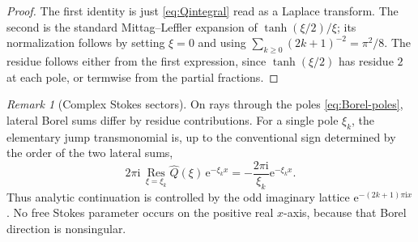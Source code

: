 \documentclass[11pt]{article}
\theoremstyle{definition}
\theoremstyle{remark}
\newtheorem{remark}[theorem]{Remark}
\newcommand{\e}{\mathrm e}
\newcommand{\ii}{\mathrm i}
\newcommand{\Res}{\operatorname*{Res}}
\begin{document}
\begin{proof}
The first identity is just \eqref{eq:Qintegral} read as a Laplace transform.  The second is the standard Mittag--Leffler expansion of $\tanh(\xi/2)/\xi$; its normalization follows by setting $\xi=0$ and using $\sum_{k\ge0}(2k+1)^{-2}=\pi^2/8$.  The residue follows either from the first expression, since $\tanh(\xi/2)$ has residue $2$ at each pole, or termwise from the partial fractions.
\end{proof}

\begin{remark}[Complex Stokes sectors]\label{rem:Stokes}
On rays through the poles \eqref{eq:Borel-poles}, lateral Borel sums differ by residue contributions.  For a single pole $\xi_k$, the elementary jump transmonomial is, up to the conventional sign determined by the order of the two lateral sums,
\begin{equation}\label{eq:Stokes-elementary}
 2\pi\ii\,\Res_{\xi=\xi_k}\widehat Q(\xi)\,
 \e^{-\xi_kx}
 =-\frac{2\pi\ii}{\xi_k}\e^{-\xi_kx}.
\end{equation}
Thus analytic continuation is controlled by the odd imaginary lattice
$\e^{-(2k+1)\pi\ii x}$.  No free Stokes parameter occurs on the positive real $x$-axis, because that Borel direction is nonsingular.
\end{remark}
\end{document}
